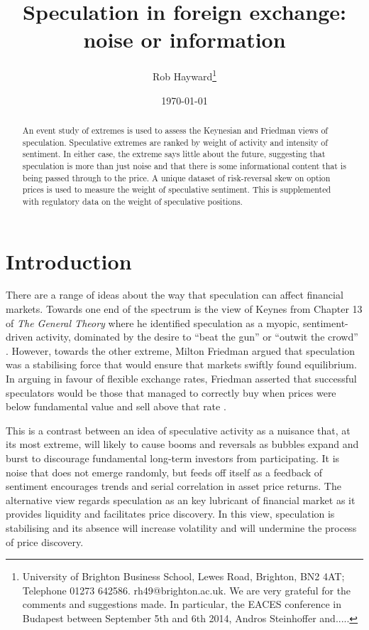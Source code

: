 \documentclass[12pt, a4paper, oneside]{article} %
\begin{document}
\title{Speculation in foreign exchange: noise or information}
\author{Rob Hayward\footnote{University of Brighton Business School, Lewes Road, Brighton, BN2 4AT; Telephone 01273 642586.  rh49@brighton.ac.uk.  We are very grateful for the comments and suggestions made.  In particular, the EACES conference in Budapest between September 5th and 6th 2014, Andros Steinhoffer and.....}} 
\date{\today}
\maketitle
\begin{abstract}
An event study of extremes is used to assess the Keynesian and Friedman views of speculation.    Speculative extremes are ranked by weight of activity and intensity of sentiment.  In either case, the extreme says little about the future, suggesting that speculation is more than just noise and that there is some informational content that is being passed through to the price. A unique dataset of risk-reversal skew on option prices is used to measure the weight of speculative sentiment.  This is supplemented with regulatory data on the weight of speculative positions.  
\end{abstract}

\section{Introduction}

There are a range of ideas about the way that speculation can affect financial markets.  Towards one end of the spectrum is the view of Keynes from Chapter 13 of \emph{The General Theory} where he identified speculation as a myopic, sentiment-driven activity, dominated by the desire to ``beat the gun'' or  ``outwit the crowd'' \citep[p. 101]{Keynes1936}.  However, towards the other extreme, Milton Friedman argued that speculation was a stabilising force that would ensure that markets swiftly found equilibrium. In arguing in favour of flexible exchange rates, Friedman asserted that successful speculators would be those that managed to correctly buy when prices  were below fundamental value and sell above that rate \citep{FriedmanPositive}. 

This is a contrast between an idea of speculative activity as a nuisance that, at its most extreme, will likely to cause booms and reversals as bubbles expand and burst to discourage fundamental long-term investors from participating.  It is noise that does not emerge randomly, but feeds off itself as a feedback of sentiment  encourages  trends and serial correlation in asset price returns.  The alternative view regards speculation as an key lubricant of financial market as it provides liquidity and facilitates price discovery. In this view, speculation is stabilising and its absence will increase volatility and will undermine the process of price discovery.  
\end{document}
